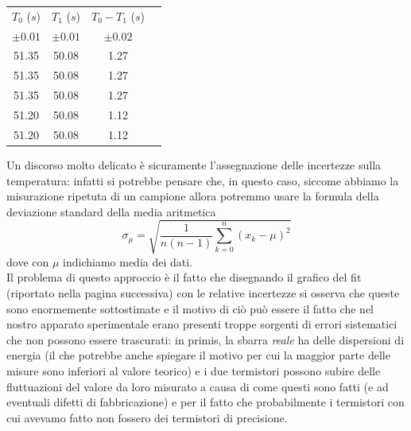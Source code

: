 \documentclass{article}
\begin{document}
\begin{table}
	\centering	
	\begin{tabular}{c c c c} \toprule
		$T_0$ ($s$) & $T_1$ ($s$) & $T_0 - T_1$ ($s$) \\
		$\pm 0.01$ & $\pm 0.01$   & $\pm 0.02$ \\ \toprule
		51.35 &  50.08 &  1.27 \\ \midrule
		51.35 &  50.08 &  1.27 \\ \midrule
		51.35 &  50.08 &  1.27 \\ \midrule
		51.20 &  50.08 &  1.12 \\ \midrule
		51.20 &  50.08 &  1.12 \\ \bottomrule
	\end{tabular}
\end{table}

\noindent Un discorso molto delicato è sicuramente l'assegnazione delle incertezze sulla temperatura: infatti si potrebbe pensare che, in questo caso, siccome abbiamo la misurazione ripetuta di un campione allora potremmo usare la formula della deviazione standard della media aritmetica
\begin{equation}
	\sigma_\mu = \sqrt{\frac{1}{n(n-1)} \sum_{k = 0}^{n} (x_k - \mu)^2}
\end{equation}
dove con $\mu$ indichiamo media dei dati. \\
Il problema di questo approccio è il fatto che disegnando il grafico del fit (riportato nella pagina successiva) con le relative incertezze si osserva che queste sono enormemente sottostimate e il motivo di ciò può essere il fatto che nel nostro apparato sperimentale erano presenti troppe sorgenti di errori sistematici che non possono essere trascurati: in primis, la sbarra \emph{reale} ha delle dispersioni di energia (il che potrebbe anche spiegare il motivo per cui la maggior parte delle misure sono inferiori al valore teorico) e i due termistori possono subire delle fluttuazioni del valore da loro misurato a causa di come questi sono fatti (e ad eventuali difetti di fabbricazione) e per il fatto che probabilmente i termistori con cui avevamo fatto non fossero dei termistori di precisione.
\end{document}
